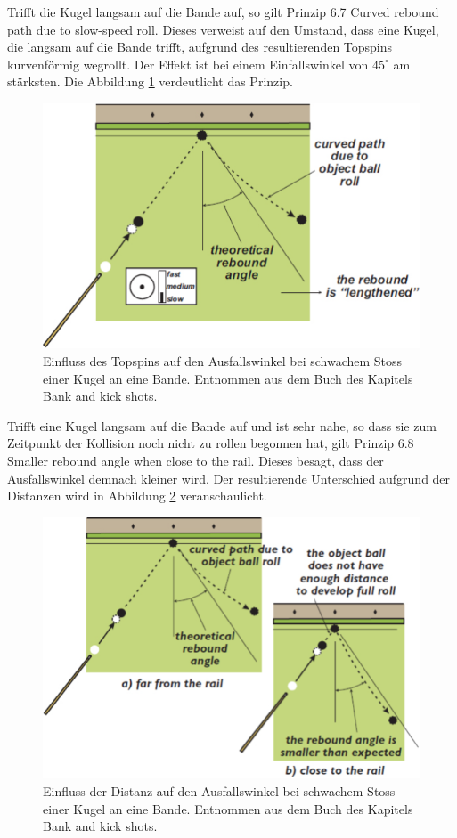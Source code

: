 Trifft die Kugel langsam auf die Bande auf, so gilt Prinzip 6.7 \glqq Curved rebound path due to slow-speed roll\grqq.
Dieses verweist auf den Umstand, dass eine Kugel, die langsam auf die Bande trifft, aufgrund des resultierenden
Topspins kurvenförmig wegrollt. Der Effekt ist bei einem Einfallswinkel von $45^{\circ}$ am stärksten\cite{book:the_ilustrated_principles_of_pool_and_billiards}.
Die Abbildung \ref{fig:rebound_angle_no_spin_slow_shot} verdeutlicht das Prinzip.

\begin{figure}[h!]
    \begin{center}
        \includegraphics[width=0.4\linewidth]{../common/03_billiard_ai/resources/57_rebound_angle_no_spin_slow_shot.png}
    \end{center}
    \caption{Einfluss des Topspins auf den Ausfallswinkel bei schwachem Stoss einer Kugel an eine Bande.
    Entnommen aus dem Buch \cite{book:the_ilustrated_principles_of_pool_and_billiards} des Kapitels  Bank and kick shots\grqq.}
    \label{fig:rebound_angle_no_spin_slow_shot}
\end{figure}

Trifft eine Kugel langsam auf die Bande auf und ist sehr nahe, so dass sie zum Zeitpunkt der Kollision noch nicht zu rollen begonnen hat,
gilt Prinzip 6.8 \glqq Smaller rebound angle when close to the rail\grqq.
Dieses besagt, dass der Ausfallswinkel demnach kleiner wird\cite{book:the_ilustrated_principles_of_pool_and_billiards}.
Der resultierende Unterschied aufgrund der Distanzen wird in Abbildung \ref{fig:rebound_angle_no_spin_slow_shot_distance} veranschaulicht.

\begin{figure}[h!]
    \begin{center}
        \includegraphics[width=0.4\linewidth]{../common/03_billiard_ai/resources/58_rebound_angle_no_spin_slow_shot_distance.png}
    \end{center}
    \caption{Einfluss der Distanz auf den Ausfallswinkel bei schwachem Stoss einer Kugel an eine Bande.
    Entnommen aus dem Buch \cite{book:the_ilustrated_principles_of_pool_and_billiards} des Kapitels  Bank and kick shots\grqq.}
    \label{fig:rebound_angle_no_spin_slow_shot_distance}
\end{figure}


